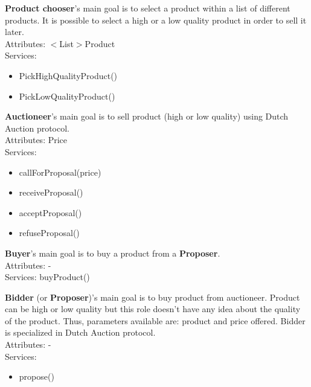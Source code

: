 \documentclass[a4paper,11pt]{report}
\begin{document}
  \begin{multicols}{2}
  \begin{mdframed}
  \textbf{Product chooser}'s main goal is to select a product within a list of different 
  products. It is possible to select a high or a low quality product in order to sell it 
  later.\\
  Attributes: $<$List$>$Product\\
  Services:\vspace{-5pt}
  \begin{itemize}
    \itemsep0pt
    \item PickHighQualityProduct()
    \item PickLowQualityProduct()
  \end{itemize}
  \end{mdframed}
  \begin{mdframed}
  \textbf{Auctioneer}'s main goal is to sell product (high or low quality) using Dutch Auction 
  protocol.\\
  Attributes: Price\\
  Services:\vspace{-5pt}
  \begin{itemize}
    \itemsep0pt
    \item callForProposal(price)
    \item receiveProposal()
    \item acceptProposal()
    \item refuseProposal()
  \end{itemize}
  \end{mdframed}
  \begin{mdframed}
  \textbf{Buyer}'s main goal is to buy a product from a \textbf{Proposer}.\\
  Attributes: -\\
  Services: buyProduct()
  \end{mdframed}
  \begin{mdframed}
  \textbf{Bidder} (or \textbf{Proposer})'s main goal is to buy product from auctioneer. Product 
  can be high or low quality but this role doesn't have any idea about the quality of the 
  product. Thus, parameters available are: product and price offered. Bidder is specialized 
  in Dutch Auction protocol.\\
  Attributes: -\\
  Services: \vspace{-5pt}
  \begin{itemize}
   \itemsep0pt
   \item propose()

\end{itemize}
\end{mdframed}
\end{multicols}
\end{document}
